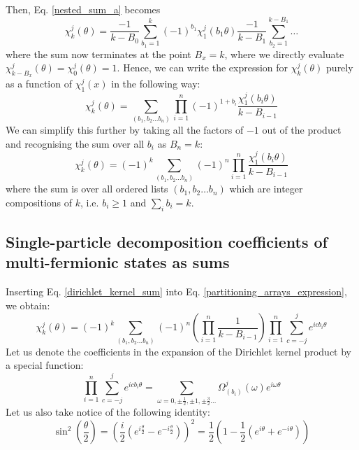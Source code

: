 \documentclass[12pt]{article}
\begin{document}
	Then, Eq. \ref{nested_sum_a} becomes
	\begin{equation}
	\chi^j_k(\theta) = \frac{-1}{k-B_0}\sum_{b_1=1}^k (-1)^{b_1} \chi^j_1(b_1\theta)\frac{-1}{k-B_1}\sum_{b_2=1}^{k-B_1}\dots
	\end{equation}
	where the sum now terminates at the point $B_x = k$, where we directly evaluate $\chi^j_{k-B_x}(\theta)=\chi^j_{0}(\theta)=1$. Hence, we can write the expression for $\chi^j_k(\theta)$ purely as a function of $\chi^j_1(x)$ in the following way:
	\begin{equation}
	\chi^j_k(\theta) = \sum_{(b_1, b_2\dots b_n)}\prod_{i=1}^n (-1)^{1+b_i}\frac{\chi^j_1(b_i\theta)}{k-B_{i-1}}
	\end{equation}
	We can simplify this further by taking all the factors of $-1$ out of the product and recognising the sum over all $b_i$ as $B_n=k$:
	\begin{equation} \label{partitioning_arrays_expression}
	\chi^j_k(\theta) = (-1)^k\sum_{(b_1, b_2\dots b_n)}(-1)^n\prod_{i=1}^n \frac{\chi^j_1(b_i\theta)}{k-B_{i-1}}
	\end{equation}
	where the sum is over all ordered lists $(b_1, b_2\dots b_n)$ which are integer compositions of $k$, i.e. $b_i\geq 1$ and $\sum_ib_i = k$.
	
	\subsection{Single-particle decomposition coefficients of multi-fermionic states as sums}
	Inserting Eq. \ref{dirichlet_kernel_sum} into Eq. \ref{partitioning_arrays_expression}, we obtain:
	\begin{equation}
	\chi^j_k(\theta) = (-1)^k\sum_{(b_1, b_2\dots b_n)}(-1)^n\left(\prod_{i=1}^n \frac{1}{k-B_{i-1}}\right)\prod_{i=1}^n \sum_{c=-j}^j e^{icb_i\theta}
	\end{equation}
	Let us denote the coefficients in the expansion of the Dirichlet kernel product by a special function:
	\begin{equation} \label{omega_distribution_decomposition}
	\prod_{i=1}^n \sum_{c=-j}^j e^{icb_i\theta}=\sum_{\omega=0,\pm\frac{1}{2},\pm 1,\pm\frac{3}{2}\dots}\Omega^j_{(b_i)}(\omega)e^{i\omega\theta}
	\end{equation}
	Let us also take notice of the following identity:
	\begin{equation}
	\sin^2(\frac{\theta}{2})=\left(\frac{i}{2}\left(e^{i\frac{\theta}{2}}-e^{-i\frac{\theta}{2}}\right)\right)^2=\frac{1}{2}\left(1-\frac{1}{2}\left(e^{i\theta}+e^{-i\theta}\right)\right)
	\end{equation}
	
\end{document}

